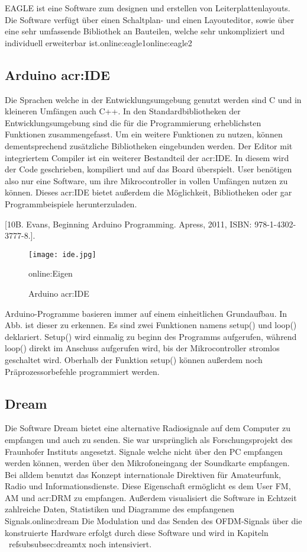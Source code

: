 EAGLE ist eine Software zum designen und erstellen von Leiterplattenlayouts. Die Software verfügt über einen Schaltplan- und einen Layouteditor, sowie über eine sehr umfassende Bibliothek an Bauteilen, welche sehr unkompliziert und individuell erweiterbar ist.\gls{online:eagle1}\gls{online:eagle2}

\subsection{Arduino \gls{acr:IDE}}
\label{subsec:Unterabschnitt12}

Die Sprachen welche in der Entwicklungsumgebung genutzt werden sind C und in kleineren Umfängen auch C++. In den Standardbibliotheken der Entwicklungsumgebung sind die für die Programmierung erheblichsten Funktionen zusammengefasst. Um ein weitere Funktionen zu nutzen, können dementsprechend zusätzliche Bibliotheken eingebunden werden. 
Der Editor mit integriertem Compiler ist ein weiterer Bestandteil der \gls{acr:IDE}. In diesem wird der Code geschrieben, kompiliert und auf das Board überspielt. User benötigen also nur eine Software, um ihre Mikrocontroller in vollen Umfängen nutzen zu können. Dieses \gls{acr:IDE} bietet außerdem die Möglichkeit, Bibliotheken oder gar Programmbeispiele herunterzuladen. 

[10B. Evans, Beginning Arduino Programming. Apress, 2011, ISBN: 978-1-4302-
3777-8.].

\begin{figure}[H]
	\centering
	\texttt{[image: ide.jpg]}
	\caption[Arduino \gls{acr:IDE}]{Arduino \gls{acr:IDE}}\gls{online:Eigen}
	\label{fig:ide}
\end{figure}


Arduino-Programme basieren immer auf einem einheitlichen Grundaufbau. In Abb. ist
dieser zu erkennen. Es sind zwei Funktionen namens setup() und loop() deklariert.
Setup() wird einmalig zu beginn des Programms aufgerufen, während loop() direkt im Anschuss aufgerufen wird, bis der Mikrocontroller stromlos geschaltet wird. Oberhalb der Funktion setup() können außerdem noch Präprozessorbefehle programmiert werden.

\subsection{Dream}
\label{subsec:Unterabschnitt12}
Die Software Dream bietet eine alternative Radiosignale auf dem Computer zu empfangen und auch zu senden. Sie war ursprünglich als Forschungsprojekt des Fraunhofer Instituts angesetzt. Signale welche nicht über den PC empfangen werden können, werden über den Mikrofoneingang der Soundkarte empfangen.
Bei alldem benutzt das Konzept internationale Direktiven für Amateurfunk, Radio und Informationsdienste.
Diese Eigenschaft ermöglicht es dem User FM, AM und \gls{acr:DRM} zu empfangen. Außerdem visualisiert die Software in Echtzeit zahlreiche Daten, Statistiken und Diagramme des empfangenen Signals.\gls{online:dream}
Die Modulation und das Senden des OFDM-Signals über die konstruierte Hardware erfolgt durch diese Software und wird in Kapiteln ~ref\gls{subsubsec:dreamtx} noch intensiviert.